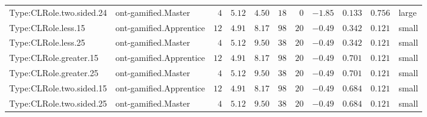 \documentclass[6pt,a4paper]{article}
\begin{document}
{\begin{longtable}{llrrrrrrrrl}
Type:CLRole.two.sided.24&ont-gamified.Master&$ 4$&$5.12$&$ 4.50$&$ 18$&$ 0$&$-1.85$&$0.133$&$0.756$&large\tabularnewline
Type:CLRole.less.15&ont-gamified.Apprentice&$12$&$4.91$&$ 8.17$&$ 98$&$20$&$-0.49$&$0.342$&$0.121$&small\tabularnewline
Type:CLRole.less.25&ont-gamified.Master&$ 4$&$5.12$&$ 9.50$&$ 38$&$20$&$-0.49$&$0.342$&$0.121$&small\tabularnewline
Type:CLRole.greater.15&ont-gamified.Apprentice&$12$&$4.91$&$ 8.17$&$ 98$&$20$&$-0.49$&$0.701$&$0.121$&small\tabularnewline
Type:CLRole.greater.25&ont-gamified.Master&$ 4$&$5.12$&$ 9.50$&$ 38$&$20$&$-0.49$&$0.701$&$0.121$&small\tabularnewline
\newpage
Type:CLRole.two.sided.15&ont-gamified.Apprentice&$12$&$4.91$&$ 8.17$&$ 98$&$20$&$-0.49$&$0.684$&$0.121$&small\tabularnewline
Type:CLRole.two.sided.25&ont-gamified.Master&$ 4$&$5.12$&$ 9.50$&$ 38$&$20$&$-0.49$&$0.684$&$0.121$&small\tabularnewline
\hline
\end{longtable}}
\end{document}

